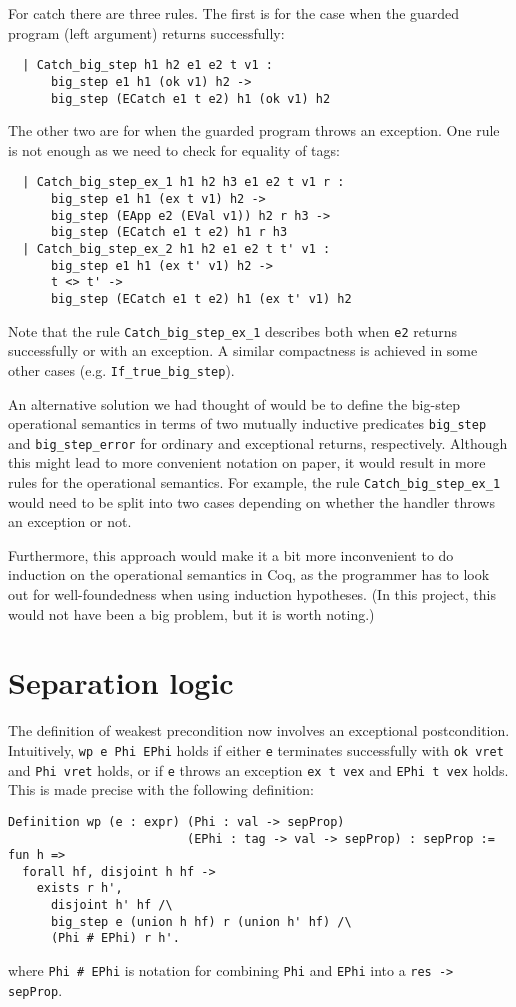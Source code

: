 \documentclass{article}
\begin{document}
For catch there are three rules. The first is for the case when the guarded program (left argument) returns successfully:
\begin{lstlisting}
  | Catch_big_step h1 h2 e1 e2 t v1 :
      big_step e1 h1 (ok v1) h2 ->
      big_step (ECatch e1 t e2) h1 (ok v1) h2
\end{lstlisting}
The other two are for when the guarded program throws an exception. One rule is not enough as we need to check for equality of tags:
\begin{lstlisting}
  | Catch_big_step_ex_1 h1 h2 h3 e1 e2 t v1 r :
      big_step e1 h1 (ex t v1) h2 ->
      big_step (EApp e2 (EVal v1)) h2 r h3 ->
      big_step (ECatch e1 t e2) h1 r h3
  | Catch_big_step_ex_2 h1 h2 e1 e2 t t' v1 :
      big_step e1 h1 (ex t' v1) h2 ->
      t <> t' ->
      big_step (ECatch e1 t e2) h1 (ex t' v1) h2
\end{lstlisting}
Note that the rule \texttt{Catch\_big\_step\_ex\_1} describes both when \texttt{e2} returns successfully or with an exception. A similar compactness is achieved
in some other cases (e.g. \texttt{If\_true\_big\_step}).

An alternative solution we had thought of would be to define the big-step operational semantics in terms of two mutually inductive predicates \texttt{big\_step}
and \texttt{big\_step\_error} for ordinary and exceptional returns, respectively. Although this might lead to more convenient notation on paper,
it would result in more rules for the operational semantics. For example, the rule \texttt{Catch\_big\_step\_ex\_1} would need to be split into two cases
depending on whether the handler throws an exception or not.

Furthermore, this approach would make it a bit more inconvenient to do induction on the operational semantics in Coq, as the programmer has to look out for
well-foundedness when using induction hypotheses. (In this project, this would not have been a big problem, but it is worth noting.)

\section{Separation logic}

The definition of weakest precondition now involves an exceptional postcondition. Intuitively, \texttt{wp e Phi EPhi} holds if either \texttt{e} terminates
successfully with \texttt{ok vret} and \texttt{Phi vret} holds, or if \texttt{e} throws an exception \texttt{ex t vex} and \texttt{EPhi t vex} holds.
This is made precise with the following definition:
\begin{lstlisting}
Definition wp (e : expr) (Phi : val -> sepProp)
                         (EPhi : tag -> val -> sepProp) : sepProp := fun h =>
  forall hf, disjoint h hf ->
    exists r h',
      disjoint h' hf /\
      big_step e (union h hf) r (union h' hf) /\
      (Phi # EPhi) r h'.
\end{lstlisting}
where \texttt{Phi \# EPhi} is notation for combining \texttt{Phi} and \texttt{EPhi} into a \texttt{res -> sepProp}.
\end{document}
